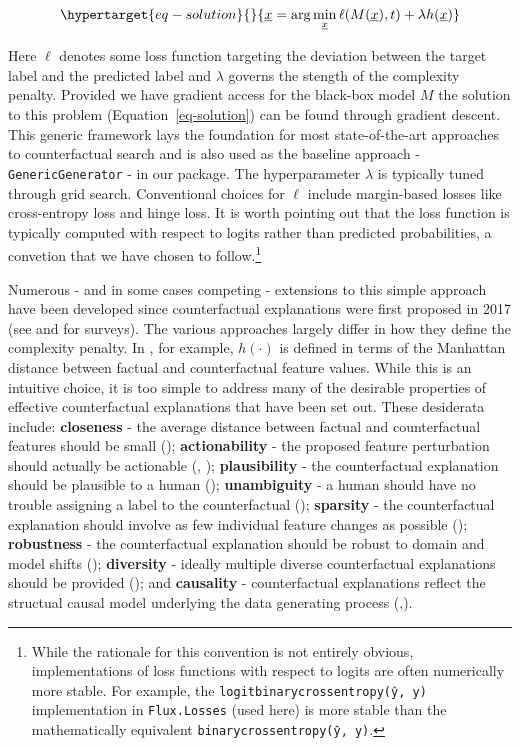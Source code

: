 \documentclass[
  letterpaper,
  DIV=11,
  numbers=noendperiod]{scrartcl}
\begin{document}
\begin{equation}\protect\hypertarget{eq-solution}{}{
\underline{x} = \arg \min_{\underline{x}}  \ell(M(\underline{x}),t) + \lambda h(\underline{x})
}\label{eq-solution}\end{equation}

Here \(\ell\) denotes some loss function targeting the deviation between
the target label and the predicted label and \(\lambda\) governs the
stength of the complexity penalty. Provided we have gradient access for
the black-box model \(M\) the solution to this problem
(Equation~\ref{eq-solution}) can be found through gradient descent. This
generic framework lays the foundation for most state-of-the-art
approaches to counterfactual search and is also used as the baseline
approach - \texttt{GenericGenerator} - in our package. The
hyperparameter \(\lambda\) is typically tuned through grid search.
Conventional choices for \(\ell\) include margin-based losses like
cross-entropy loss and hinge loss. It is worth pointing out that the
loss function is typically computed with respect to logits rather than
predicted probabilities, a convetion that we have chosen to
follow.\footnote{While the rationale for this convention is not entirely
  obvious, implementations of loss functions with respect to logits are
  often numerically more stable. For example, the
  \texttt{logitbinarycrossentropy(ŷ,\ y)} implementation in
  \texttt{Flux.Losses} (used here) is more stable than the
  mathematically equivalent \texttt{binarycrossentropy(ŷ,\ y)}.}

Numerous - and in some cases competing - extensions to this simple
approach have been developed since counterfactual explanations were
first proposed in 2017 (see \cite{verma2020counterfactual} and
\cite{karimi2020survey} for surveys). The various approaches largely
differ in how they define the complexity penalty. In
\cite{wachter2017counterfactual}, for example, \(h(\cdot)\) is defined
in terms of the Manhattan distance between factual and counterfactual
feature values. While this is an intuitive choice, it is too simple to
address many of the desirable properties of effective counterfactual
explanations that have been set out. These desiderata include:
\textbf{closeness} - the average distance between factual and
counterfactual features should be small
(\cite{wachter2017counterfactual}); \textbf{actionability} - the
proposed feature perturbation should actually be actionable
(\cite{ustun2019actionable}, \cite{poyiadzi2020face});
\textbf{plausibility} - the counterfactual explanation should be
plausible to a human (\cite{joshi2019towards}); \textbf{unambiguity} - a
human should have no trouble assigning a label to the counterfactual
(\cite{schut2021generating}); \textbf{sparsity} - the counterfactual
explanation should involve as few individual feature changes as possible
(\cite{schut2021generating}); \textbf{robustness} - the counterfactual
explanation should be robust to domain and model shifts
(\cite{upadhyay2021towards}); \textbf{diversity} - ideally multiple
diverse counterfactual explanations should be provided
(\cite{mothilal2020explaining}); and \textbf{causality} - counterfactual
explanations reflect the structual causal model underlying the data
generating process
(\cite{karimi2020algorithmic},\cite{karimi2021algorithmic}).
\end{document}
